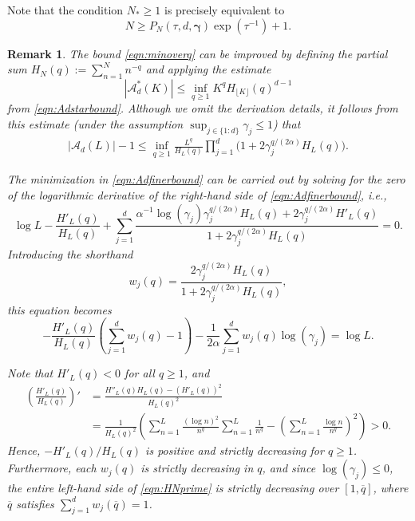 \documentclass[pdflatex,sn-basic,Numbered]{sn-jnl}%
\newcommand{\bsgamma}{\boldsymbol{\gamma}}
\newcommand{\Acal}{\mathcal{A}}
\theoremstyle{thmstyleone}%
\newtheorem{remark}[theorem]{Remark}
\theoremstyle{thmstyletwo}%
\begin{document}
Note that the condition $N_* \ge 1$ is precisely equivalent to
\begin{equation}\label{eq:cond_Nstar_one}
N \ge P_N (\tau, d, \bsgamma) \exp{(\tau^{-1})} +1.
\end{equation}

\begin{remark}
The bound \eqref{eqn:minoverq} can be improved by defining the partial sum $H_N(q):=\sum_{n=1}^N n^{-q}$ and applying the estimate
\[ |\Acal^*_d(K)|\leq \inf_{q\geq 1} K^q  H_{\lfloor K\rfloor}(q)^{d-1}\]
from \eqref{eqn:Adstarbound}. Although we omit the derivation details, it follows from this estimate (under the assumption $\sup_{j\in \{1{:}d\}}\gamma_j\leq 1$) that
\begin{align}\label{eqn:Adfinerbound}
    |\Acal_d(L)|-1 \leq \inf_{q\geq 1}  \frac{L^{q}}{ H_{L}(q)} \prod_{j=1}^d \Big(1+2\gamma^{q/(2\alpha)}_j  H_{L}(q)\Big).
\end{align}

The minimization in \eqref{eqn:Adfinerbound} can be carried out by solving for the zero of the logarithmic derivative of the right-hand side of \eqref{eqn:Adfinerbound}, i.e.,
\[ \log L -\frac{H'_L(q)}{H_L(q)}+\sum_{j=1}^d\frac{\alpha^{-1}\log(\gamma_j)\gamma^{q/(2\alpha)}_j  H_{L}(q)+2\gamma^{q/(2\alpha)}_j  H'_{L}(q)}{1+2\gamma^{q/(2\alpha)}_j  H_{L}(q)}=0. \]
Introducing the shorthand
\[ w_j(q)=\frac{2\gamma^{q/(2\alpha)}_j  H_{L}(q)}{1+2\gamma^{q/(2\alpha)}_j  H_{L}(q)},\]
this equation becomes
\begin{equation}\label{eqn:HNprime}
    -\frac{H'_L(q)}{H_L(q)}\left(\sum_{j=1}^d w_j(q)-1\right)-\frac{1}{2\alpha}\sum_{j=1}^d w_j(q)\log(\gamma_j)=\log L. 
\end{equation}

Note that $H'_L(q) < 0$ for all $q \geq 1$, and
\begin{align*}
   \left( \frac{H'_L(q)}{H_L(q)} \right)' &= \frac{H''_L(q)H_L(q) - \left(H'_L(q)\right)^2}{H_L(q)^2} \\
   &= \frac{1}{H_L(q)^2} \left( \sum_{n=1}^L \frac{(\log n)^2}{n^q} \sum_{n=1}^L \frac{1}{n^q} - \left( \sum_{n=1}^L \frac{\log n}{n^q} \right)^2 \right) > 0.
\end{align*}
Hence, $-H'_L(q)/H_L(q)$ is positive and strictly decreasing for $q \geq 1$. Furthermore, each $w_j(q)$ is strictly decreasing in $q$, and since $\log(\gamma_j) \leq 0$, the entire left-hand side of \eqref{eqn:HNprime} is strictly decreasing over $[1,\overline{q}]$, where $\overline{q}$ satisfies $\sum_{j=1}^d w_j(\overline{q})=1$. 


\end{remark}
\end{document}
